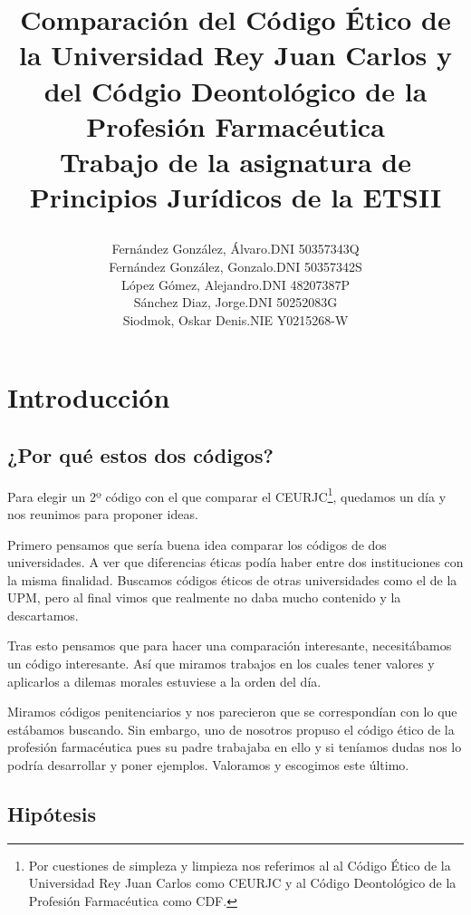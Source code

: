 \documentclass[11pt,a4paper]{article}
\author{
	\begin{tabular}{rl}
		Fernández González, Álvaro. & DNI 50357343Q\\
		Fernández González, Gonzalo. & DNI 50357342S\\
		López Gómez, Alejandro. & DNI 48207387P\\
		Sánchez Diaz, Jorge. & DNI 50252083G \\
		Siodmok, Oskar Denis. & NIE Y0215268-W 
	\end{tabular}
}
\title{Comparación del Código Ético de la Universidad Rey Juan Carlos y del Códgio Deontológico de la Profesión Farmacéutica\\
	[0.3em]\large Trabajo de la asignatura de Principios Jurídicos de la ETSII

	}
\begin{document}
\maketitle
\tableofcontents\pagebreak

\setlength\parindent{.5in}

\section{Introducción}
\subsection{¿Por qué estos dos códigos?}
Para elegir un 2º código con el que comparar el CEURJC\footnote{Por cuestiones de simpleza y limpieza nos referimos al al Código Ético de la Universidad Rey Juan Carlos como CEURJC y al Código Deontológico de la Profesión Farmacéutica como CDF.}, quedamos un día y nos reunimos para proponer ideas.

Primero pensamos que sería buena idea comparar los códigos de dos universidades. A ver que diferencias éticas podía haber entre dos instituciones con la misma finalidad. Buscamos códigos éticos de otras universidades como el de la UPM, pero al final vimos que realmente no daba mucho contenido y la descartamos.

Tras esto pensamos que para hacer una comparación interesante, necesitábamos un código interesante. Así que miramos trabajos en los cuales tener valores y aplicarlos a dilemas morales estuviese a la orden del día.

Miramos códigos penitenciarios y nos parecieron que se correspondían con lo que estábamos buscando. Sin embargo, uno de nosotros propuso el código ético de la profesión farmacéutica pues su padre trabajaba en ello y si teníamos dudas nos lo podría desarrollar y poner ejemplos. Valoramos y escogimos este último.

\subsection{Hipótesis}
\end{document}

